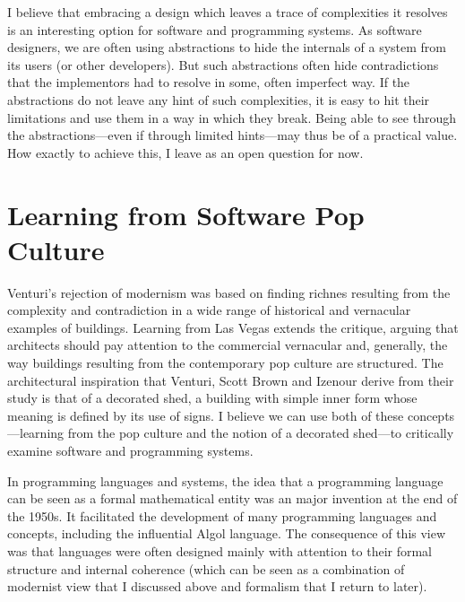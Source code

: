 I believe that embracing a design which leaves a trace of complexities it resolves is an interesting
option for software and programming systems. As software designers, we are often using abstractions
to hide the internals of a system from its users (or other developers). But such abstractions often
hide contradictions that the implementors had to resolve in some, often imperfect way. If the
abstractions do not leave any hint of such complexities, it is easy to hit their limitations and
use them in a way in which they break. Being able to see through the abstractions---even if
through limited hints---may thus be of a practical value.
How exactly to achieve this, I leave as an open question for now.

\section{Learning from Software Pop Culture}

Venturi's rejection of modernism was based on finding richnes resulting from the complexity and
contradiction in a wide range of historical and vernacular examples of buildings. Learning from Las
Vegas extends the critique, arguing that architects should pay attention to the commercial
vernacular and, generally, the way buildings resulting from the contemporary pop culture are
structured. The architectural inspiration that Venturi, Scott Brown and Izenour derive from their
study is that of a decorated shed, a building with simple inner form whose meaning is defined by its
use of signs. I believe we can use both of these concepts---learning from the pop culture and
the notion of a decorated shed---to critically examine software and programming systems.

In programming languages and systems, the idea that a programming language can be seen as a
formal mathematical entity was an major invention at the end of the 1950s. It
facilitated the development of many programming languages and concepts, including the influential
Algol language. The consequence of this view was that languages were often designed mainly
with attention to their formal structure and internal coherence (which can be seen as
a combination of modernist view that I discussed above and formalism that I return to later).

